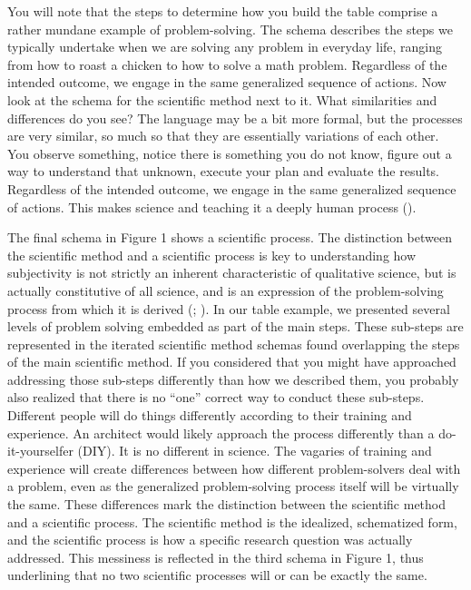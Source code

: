 \documentclass[
  letterpaper,
]{book}
\begin{document}
You will note that the steps to determine how you build the table
comprise a rather mundane example of problem-solving. The schema
describes the steps we typically undertake when we are solving any
problem in everyday life, ranging from how to roast a chicken to how to
solve a math problem. Regardless of the intended outcome, we engage in
the same generalized sequence of actions. Now look at the schema for the
scientific method next to it. What similarities and differences do you
see? The language may be a bit more formal, but the processes are very
similar, so much so that they are essentially variations of each other.
You observe something, notice there is something you do not know, figure
out a way to understand that unknown, execute your plan and evaluate the
results. Regardless of the intended outcome, we engage in the same
generalized sequence of actions. This makes science and teaching it a
deeply human process ().

The final schema in Figure 1 shows a scientific process. The distinction
between the scientific method and a scientific process is key to
understanding how subjectivity is not strictly an inherent
characteristic of qualitative science, but is actually constitutive of
all science, and is an expression of the problem-solving process from
which it is derived (; ). In our table example, we presented several levels of problem
solving embedded as part of the main steps. These sub-steps are
represented in the iterated scientific method schemas found overlapping
the steps of the main scientific method. If you considered that you
might have approached addressing those sub-steps differently than how we
described them, you probably also realized that there is no ``one''
correct way to conduct these sub-steps. Different people will do things
differently according to their training and experience. An architect
would likely approach the process differently than a do-it-yourselfer
(DIY). It is no different in science. The vagaries of training and
experience will create differences between how different problem-solvers
deal with a problem, even as the generalized problem-solving process
itself will be virtually the same. These differences mark the
distinction between the scientific method and a scientific process. The
scientific method is the idealized, schematized form, and the scientific
process is how a specific research question was actually addressed. This
messiness is reflected in the third schema in Figure 1, thus underlining
that no two scientific processes will or can be exactly the same.
\end{document}
